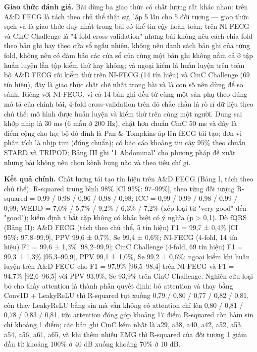 \documentclass[12pt,a4paper]{article}
\begin{document}
\noindent \textbf{Giao thức đánh giá.} Bài dùng ba giao thức có chất lượng rất khác nhau: trên A\&D FECG là tách theo chủ thể thật sự, lặp 5 lần cho 5 đối tượng — giao thức sạch và là giao thức duy nhất trong bài có thể tin cậy hoàn toàn; trên NI-FECG và CinC Challenge là "4-fold cross-validation" nhưng bài không nêu cách chia fold theo bản ghi hay theo cửa sổ ngẫu nhiên, không nêu danh sách bản ghi của từng fold, không nêu có đảm bảo các cửa sổ của cùng một bản ghi không nằm cả ở tập huấn luyện lẫn tập kiểm thử hay không; và ngoại kiểm là huấn luyện trên toàn bộ A\&D FECG rồi kiểm thử trên NI-FECG (14 tín hiệu) và CinC Challenge (69 tín hiệu), đây là giao thức chặt chẽ nhất trong bài và là con số nên dùng để so sánh. Riêng với NI-FECG, vì cả 14 bản ghi đều từ cùng một sản phụ theo đúng mô tả của chính bài, 4-fold cross-validation trên đó chắc chắn là rò rỉ dữ liệu theo chủ thể: mô hình được huấn luyện và kiểm thử trên cùng một người. Dung sai khớp nhịp là 30 ms (6 mẫu ở 200 Hz), chặt hơn chuẩn CinC 50 ms và đây là điểm cộng cho họ; bộ dò đỉnh là Pan \& Tompkins áp lên fECG tái tạo; đơn vị phân tích là nhịp tim (đúng chuẩn); có báo cáo khoảng tin cậy 95\% theo chuẩn STARD và TRIPOD; Bảng III ghi "1 Abdominal" cho phương pháp đề xuất nhưng bài không nêu chọn kênh bụng nào và theo tiêu chí gì.\par\vspace{3pt}
\noindent \textbf{Kết quả chính.} Chất lượng tái tạo tín hiệu trên A\&D FECG (Bảng I, tách theo chủ thể): R-squared trung bình 98\% [CI 95\%: 97–99\%], theo từng đối tượng R-squared = 0,99 / 0,98 / 0,96 / 0,98 / 0,98; ICC = 0,99 / 0,99 / 0,98 / 0,99 / 0,99; WEDD = 7,0\% / 5,7\% / 9,2\% / 6,3\% / 7,2\% (xếp loại từ "very good" đến "good"); kiểm định t bắt cặp không có khác biệt có ý nghĩa (p > 0,1). Dò fQRS (Bảng II): A\&D FECG (tách theo chủ thể, 5 tín hiệu) F1 = 99,7 ± 0,4\% [CI 95\%: 97,8–99,9], PPV 99,6 ± 0,7\%, Se 99,4 ± 0,6\%; NI-FECG (4-fold, 14 tín hiệu) F1 = 99,6 ± 1,3\% [98,2–99,9]; CinC Challenge (4-fold, 69 tín hiệu) F1 = 99,3 ± 1,3\% [95,3–99,9], PPV 99,1 ± 1,0\%, Se 99,2 ± 0,6\%; ngoại kiểm khi huấn luyện trên A\&D FECG cho F1 = 97,9\% [96,5–98,4] trên NI-FECG và F1 = 94,7\% [92,6–96,5] với PPV 93,9\%, Se 93,9\% trên CinC Challenge. Nghiên cứu loại bỏ cho thấy attention là thành phần quyết định: bỏ attention và thay bằng Conv1D + LeakyReLU thì R-squared tụt xuống 0,79 / 0,80 / 0,77 / 0,82 / 0,81, còn thay LeakyReLU bằng sin mà vẫn không có attention chỉ lên 0,80 / 0,81 / 0,78 / 0,83 / 0,81, tức attention đóng góp khoảng 17 điểm R-squared còn hàm sin chỉ khoảng 1 điểm; các bản ghi CinC kém nhất là a29, a38, a40, a42, a52, a53, a54, a56, a61, a65, và khi thêm nhiễu EMG thì R-squared của đối tượng 1 giảm dần từ khoảng 100\% ở 40 dB xuống khoảng 70\% ở 10 dB.\par\vspace{3pt}
\end{document}
